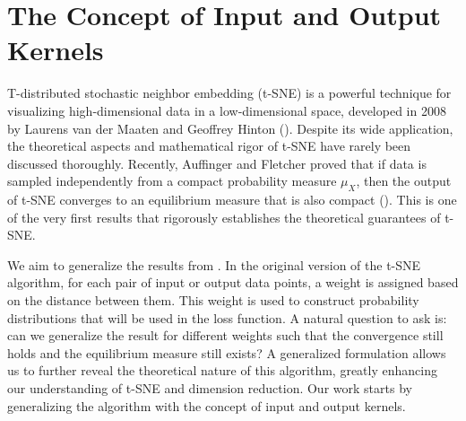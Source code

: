 \section{The Concept of Input and Output Kernels} \label{sec_intro}
T-distributed stochastic neighbor embedding (t-SNE) is a powerful technique for
visualizing high-dimensional data in a low-dimensional space, developed in 2008
by Laurens van der Maaten and Geoffrey Hinton (\cite{key}). Despite its wide
application, the theoretical aspects and mathematical rigor of t-SNE have
rarely been discussed thoroughly. Recently, Auffinger and Fletcher proved that
if data is sampled independently from a compact probability measure $\mu_X$,
then the output of t-SNE converges to an equilibrium measure that is also
compact (\cite{auffinger-tsne}). This is one of the very first results that
rigorously establishes the theoretical guarantees of t-SNE.

We aim to generalize the results from \cite{auffinger-tsne}. In the original
version of the t-SNE algorithm, for each pair of input or output data points, a
weight is assigned based on the distance between them. This weight is used to
construct probability distributions that will be used in the loss function. A
natural question to ask is: can we generalize the result for different weights
such that the convergence still holds and the equilibrium measure still exists?
A generalized formulation allows us to further reveal the theoretical nature of
this algorithm, greatly enhancing our understanding of t-SNE and dimension
reduction. Our work starts by generalizing the algorithm with the concept of
input and output kernels.

